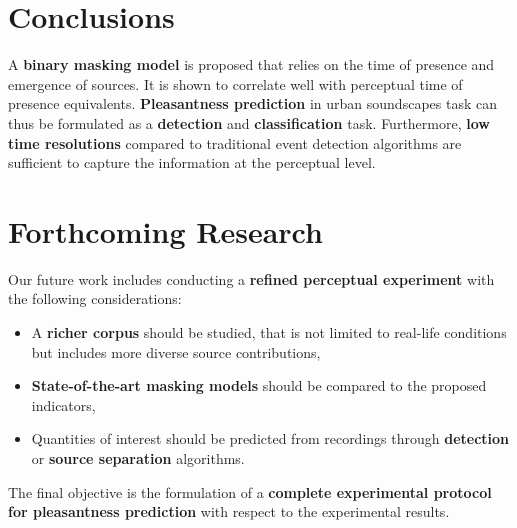 \documentclass[a0,portrait]{a0poster}
\begin{document}
\begin{multicols}{2}

\color{SaddleBrown} %

\section*{Conclusions}

A \textbf{binary masking model} is proposed that relies on the time of presence and emergence of sources. It is shown to correlate well with perceptual time of presence equivalents. \textbf{Pleasantness prediction} in urban soundscapes task can thus be formulated as a \textbf{detection} and \textbf{classification} task. Furthermore, \textbf{low time resolutions} compared to traditional event detection algorithms are sufficient to capture the information at the perceptual level.



\color{DarkSlateGray} %


\section*{Forthcoming Research}

Our future work includes conducting a \textbf{refined perceptual experiment} with the following considerations:
\begin{itemize}
\item A \textbf{richer corpus} should be studied, that is not limited to real-life conditions but includes more diverse source contributions,
\item \textbf{State-of-the-art masking models} should be compared to the proposed indicators,
\item Quantities of interest should be predicted from recordings through \textbf{detection} or \textbf{source separation} algorithms.
\end{itemize}
The final objective is the formulation of a \textbf{complete experimental protocol for pleasantness prediction} with respect to the experimental results.





\end{multicols}
\end{document}
